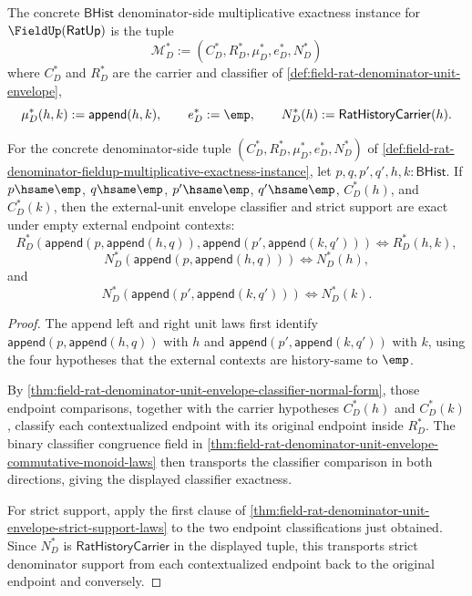 \begin{definition}
\label{def:field-rat-denominator-fieldup-multiplicative-exactness-instance}
The concrete $\mathsf{BHist}$ denominator-side multiplicative exactness instance
for $\FieldUp(\mathsf{RatUp})$ is the tuple
$$
\mathcal{M}_D^\ast:=(C_D^\ast,R_D^\ast,\mu_D^\ast,e_D^\ast,N_D^\ast)
$$
where $C_D^\ast$ and $R_D^\ast$ are the carrier and classifier of
\autoref{def:field-rat-denominator-unit-envelope},
$$
\mu_D^\ast(h,k):=\mathsf{append}(h,k),\qquad
e_D^\ast:=\emp,\qquad
N_D^\ast(h):=\mathsf{RatHistoryCarrier}(h).
$$
\end{definition}

\begin{theorem}
\label{thm:field-rat-denominator-fieldup-envelope-empty-context-exactness}
For the concrete denominator-side tuple
$(C_D^\ast,R_D^\ast,\mu_D^\ast,e_D^\ast,N_D^\ast)$ of
\autoref{def:field-rat-denominator-fieldup-multiplicative-exactness-instance},
let $p,q,p',q',h,k:\mathsf{BHist}$. If $p\hsame\emp$, $q\hsame\emp$,
$p'\hsame\emp$, $q'\hsame\emp$, $C_D^\ast(h)$, and $C_D^\ast(k)$, then the
external-unit envelope classifier and strict support are exact under empty
external endpoint contexts:
$$
R_D^\ast(\mathsf{append}(p,\mathsf{append}(h,q)),
\mathsf{append}(p',\mathsf{append}(k,q')))
\Longleftrightarrow R_D^\ast(h,k),
$$
$$
N_D^\ast(\mathsf{append}(p,\mathsf{append}(h,q)))
\Longleftrightarrow N_D^\ast(h),
$$
and
$$
N_D^\ast(\mathsf{append}(p',\mathsf{append}(k,q')))
\Longleftrightarrow N_D^\ast(k).
$$
\end{theorem}
\begin{proof}
The append left and right unit laws first identify
$\mathsf{append}(p,\mathsf{append}(h,q))$ with $h$ and
$\mathsf{append}(p',\mathsf{append}(k,q'))$ with $k$, using the four hypotheses
that the external contexts are history-same to $\emp$.

By
\autoref{thm:field-rat-denominator-unit-envelope-classifier-normal-form}, those
endpoint comparisons, together with the carrier hypotheses $C_D^\ast(h)$ and
$C_D^\ast(k)$, classify each contextualized endpoint with its original endpoint
inside $R_D^\ast$. The binary classifier congruence field in
\autoref{thm:field-rat-denominator-unit-envelope-commutative-monoid-laws} then
transports the classifier comparison in both directions, giving the displayed
classifier exactness.

For strict support, apply the first clause of
\autoref{thm:field-rat-denominator-unit-envelope-strict-support-laws} to the two
endpoint classifications just obtained. Since $N_D^\ast$ is
$\mathsf{RatHistoryCarrier}$ in the displayed tuple, this transports strict
denominator support from each contextualized endpoint back to the original
endpoint and conversely.
\end{proof}

